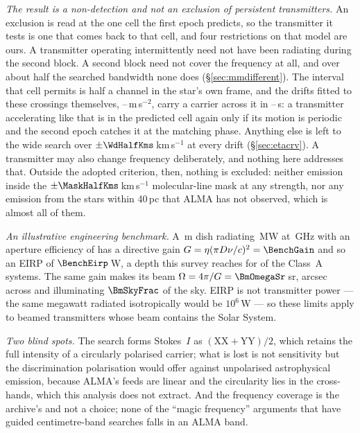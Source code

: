 \noindent\emph{The result is a non-detection and not an exclusion of
persistent transmitters.} An exclusion is read at the one cell the first
epoch predicts, so the transmitter it tests is one that comes back to that
cell, and four restrictions on that model are
ours. A transmitter operating intermittently need not have been radiating
during the second block. A second block need not cover the frequency at all,
and over about half the searched bandwidth none does
(\S\ref{sec:mmdifferent}). The interval that cell permits is half a channel
in the star's own frame, and the drifts fitted to these crossings themselves,
\ZtALosLo--\ZtALosHi\,m\,s$^{-2}$, carry a carrier across it in
\ZtSxLeaveSec--\ZtCpLeaveSec\,s: a transmitter accelerating like that is in
the predicted cell again only if its motion is periodic and the second epoch
catches it at the matching phase. Anything else is left to the wide search
over $\pm\WdHalfKms$\,km\,s$^{-1}$ at every
drift (\S\ref{sec:etacrv}). A transmitter may also change frequency deliberately,
and nothing here addresses that. Outside the adopted criterion, then, nothing
is excluded: neither emission inside the
$\pm\MaskHalfKms$\,km\,s$^{-1}$ molecular-line mask at any strength, nor any
emission from the \NGaiaCensus{} stars within 40\,pc that ALMA has not
observed, which is almost all of them.

\noindent\emph{An illustrative engineering benchmark.} A \BenchDiam\,m dish
radiating \BenchPowerMW\,MW at \BenchFreqGHz\,GHz with an aperture efficiency
of \BenchEta{} has a directive gain $G=\eta(\pi D\nu/c)^{2}=\BenchGain$ and so
an EIRP of $\BenchEirp$\,W, a depth this survey reaches for \BenchNSysA{} of
the \NSysClassA{} Class~A systems. The same gain makes its beam
$\Omega=4\pi/G=\BmOmegaSr$\,sr, \BmArcsec{} arcsec across and illuminating
$\BmSkyFrac$ of the sky. EIRP is not transmitter power --- the same megawatt
radiated isotropically would be $10^{6}$\,W --- so these limits apply to
beamed transmitters whose beam contains the Solar System.

\noindent\emph{Two blind spots.} The search forms Stokes~$I$ as
$(\mathrm{XX}+\mathrm{YY})/2$, which retains the full intensity of a circularly polarised
carrier; what is lost is not sensitivity but the discrimination polarisation
would offer against unpolarised astrophysical emission, because ALMA's feeds
are linear and the circularity lies in the cross-hands, which this analysis
does not extract. And the frequency coverage is the archive's and not a choice; none
of the ``magic frequency'' arguments that have guided centimetre-band searches
falls in an ALMA band.


